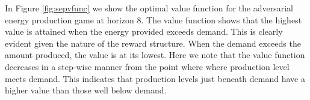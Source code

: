 
In Figure \ref{fig:sepvfunc} we show the optimal value function
for the adversarial energy production game at horizon 8. The value
function shows that the highest value is attained when the energy provided
exceeds demand. This is clearly evident given the nature of the reward structure.
When the demand exceeds the amount produced, the value is at its lowest.
Here we note that the value function decreases in a step-wise manner
from the point where where production level meets demand. This indicates
that production levels just beneath demand have a higher value than
those well below demand.

